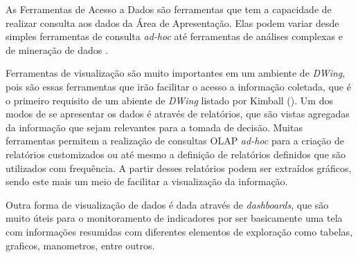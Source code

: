 As Ferramentas de Acesso a Dados são ferramentas que tem a capacidade de realizar consulta aos dados da Área de Apresentação. Elas podem variar desde simples ferramentas de consulta \emph{ad-hoc} até ferramentas de análises complexas e de mineração de dados \cite{kimball2002}.

Ferramentas de visualização são muito importantes em um ambiente de \emph{DWing}, pois são essas ferramentas que irão facilitar o acesso a informação coletada, que é o primeiro requisito de um abiente de \emph{DWing} listado por Kimball (\citeyear{kimball2002}). Um dos modos de se apresentar os dados é através de relatórios, que são vistas agregadas da informação que sejam relevantes para a tomada de decisão. Muitas ferramentas permitem a realização de consultas OLAP \emph{ad-hoc} para a criação de relatórios customizados ou até mesmo a definição de relatórios definidos que são utilizados com frequência. A partir desses relatórios podem ser extraídos gráficos, sendo este mais um meio de facilitar a visualização da informação. 

Outra forma de visualização de dados é dada através  de \emph{dashboards}, que são muito úteis para o monitoramento de indicadores por ser basicamente uma tela com informações resumidas com diferentes elementos de exploração como tabelas, graficos, manometros, entre outros.

